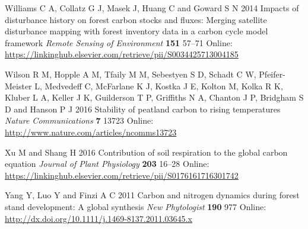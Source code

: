 \documentclass[
]{article}
\newlength{\cslhangindent}
\newenvironment{cslreferences}%
  {\setlength{\parindent}{0pt}%
  \everypar{\setlength{\hangindent}{\cslhangindent}}\ignorespaces}%
  {\par}
\begin{document}
\begin{cslreferences}
\leavevmode\hypertarget{ref-williams_impacts_2014}{}%
Williams C A, Collatz G J, Masek J, Huang C and Goward S N 2014 Impacts
of disturbance history on forest carbon stocks and fluxes: Merging
satellite disturbance mapping with forest inventory data in a carbon
cycle model framework \emph{Remote Sensing of Environment} \textbf{151}
57--71 Online:
\url{https://linkinghub.elsevier.com/retrieve/pii/S0034425713004185}

\leavevmode\hypertarget{ref-wilson_stability_2016}{}%
Wilson R M, Hopple A M, Tfaily M M, Sebestyen S D, Schadt C W,
Pfeifer-Meister L, Medvedeff C, McFarlane K J, Kostka J E, Kolton M,
Kolka R K, Kluber L A, Keller J K, Guilderson T P, Griffiths N A,
Chanton J P, Bridgham S D and Hanson P J 2016 Stability of peatland
carbon to rising temperatures \emph{Nature Communications} \textbf{7}
13723 Online: \url{http://www.nature.com/articles/ncomms13723}

\leavevmode\hypertarget{ref-xu_contribution_2016}{}%
Xu M and Shang H 2016 Contribution of soil respiration to the global
carbon equation \emph{Journal of Plant Physiology} \textbf{203} 16--28
Online:
\url{https://linkinghub.elsevier.com/retrieve/pii/S0176161716301742}

\leavevmode\hypertarget{ref-yang_carbon_2011}{}%
Yang Y, Luo Y and Finzi A C 2011 Carbon and nitrogen dynamics during
forest stand development: A global synthesis \emph{New Phytologist}
\textbf{190} 977 Online:
\url{http://dx.doi.org/10.1111/j.1469-8137.2011.03645.x}
\end{cslreferences}
\end{document}

